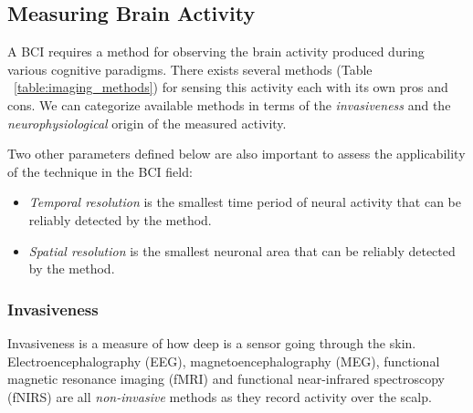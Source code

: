 \documentclass[12pt]{article}
\newcommand\mysubsection[1]{\subsection{#1}}
\newcommand\mysubsubsection[1]{\subsubsection{#1}}
\numberwithin{equation}{section}
\numberwithin{figure}{section}
\numberwithin{table}{section}
\begin{document}
\mysubsection{Measuring Brain Activity}
\par{
    A BCI requires a method for observing the brain activity produced during
    various cognitive paradigms. There exists several methods (Table ~\ref{table:imaging_methods}) for sensing
    this activity each with its own pros and cons. We can categorize available
    methods in terms of the \emph{invasiveness} and the \emph{neurophysiological}
    origin of the measured activity.
}
\par{
    Two other parameters defined below are also important to
    assess the applicability of the technique in the BCI field:
    \begin{itemize}
        \item \emph{Temporal resolution} is the smallest time period of neural activity
            that can be reliably detected by the method.
        \item \emph{Spatial resolution} is the smallest neuronal area that can be
            reliably detected by the method.
    \end{itemize}
}
\mysubsubsection{Invasiveness}
\par{
    Invasiveness is a measure of how deep is a sensor going through the skin.
    Electroencephalography (EEG), magnetoencephalography (MEG), functional magnetic
    resonance imaging (fMRI) and functional near-infrared spectroscopy (fNIRS)
    are all \emph{non-invasive} methods as they record activity over the scalp.
}
\end{document}
